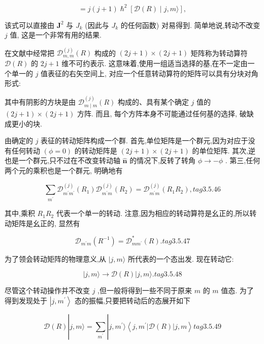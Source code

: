 $$
= j\left( {j + 1}\right) {\hslash }^{2}\left\lbrack {\mathcal{D}\left( R\right) \mid j, m\rangle }\right\rbrack ,
$$

该式可以直接由 ${\mathbf{J}}^{2}$ 与 ${J}_{k}$ (因此与 ${J}_{k}$ 的任何函数) 对易得到. 简单地说,转动不改变 $j$ 值, 这是一个非常有用的结果.

在文献中经常把 ${\mathcal{D}}_{m, m}^{\left( j\right) }\left( R\right)$ 构成的 $\left( {{2j} + 1}\right) \times \left( {{2j} + 1}\right)$ 矩阵称为转动算符 $\mathcal{D}\left( R\right)$ 的 ${2j} + 1$ 维不可约表示. 这意味着,使用一组适当选择的基,在不一定由一个单一的 $j$ 值表征的右矢空间上, 对应一个任意转动算符的矩阵可以具有分块对角形式:


其中有阴影的方块是由 ${\mathcal{D}}_{m \mid m}^{\left( j\right) }\left( R\right)$ 构成的、具有某个确定 $j$ 值的 $\left( {{2j} + 1}\right) \times \left( {{2j} + 1}\right)$ 方阵. 而且, 每个方阵本身不可能通过任何基的选择, 破缺成更小的块.



由确定的 $j$ 表征的转动矩阵构成一个群. 首先,单位矩阵是一个群元,因为对应于没有任何转动 $\left( {\phi = 0}\right)$ 的转动矩阵是 $\left( {{2j} + 1}\right) \times \left( {{2j} + 1}\right)$ 的单位矩阵. 其次,逆也是一个群元,只不过在不改变转动轴 $\widehat{\mathbf{n}}$ 的情况下,反转了转角 $\phi \rightarrow - \phi$ . 第三,任何两个元的乘积也是一个群元, 明确地有

$$
\mathop{\sum }\limits_{{m}^{\prime }}{\mathcal{D}}_{{m}^{\prime }{m}^{\prime }}^{\left( j\right) }\left( {R}_{1}\right) {\mathcal{D}}_{{m}^{\prime }m}^{\left( j\right) }\left( {R}_{2}\right) = {\mathcal{D}}_{{m}^{\prime }m}^{\left( j\right) }\left( {{R}_{1}{R}_{2}}\right) , tag{3. 5.46}
$$

其中,乘积 ${R}_{1}{R}_{2}$ 代表一个单一的转动. 注意,因为相应的转动算符是幺正的,所以转动矩阵是幺正的, 显然有

$$
{\mathcal{D}}_{{m}^{\prime }m}\left( {R}^{-1}\right) = {\mathcal{D}}_{m{m}^{\prime }}^{ * }\left( R\right) . tag{3.5.47}
$$

为了领会转动矩阵的物理意义,从 $|j, m\rangle$ 所代表的一个态出发. 现在转动它:

$$
\left| {j, m\rangle \rightarrow \mathcal{D}\left( R\right) }\right| j, m\rangle . tag{3. 5.48}
$$

尽管这个转动操作并不改变 $j$ ,但一般将得到一些不同于原来 $m$ 的 $m$ 值态. 为了得到发现处于 $\left| {j,{m}^{\prime }}\right\rangle$ 态的振幅,只要把转动后的态展开如下

$$
\mathcal{D}\left( R\right) \left| {j, m\rangle = \mathop{\sum }\limits_{{m}^{\prime }}}\right| j,{m}^{\prime }\rangle \left\langle {j,{m}^{\prime }\left| {\mathcal{D}\left( R\right) }\right| j, m}\right\rangle tag{3. 5.49}
$$

